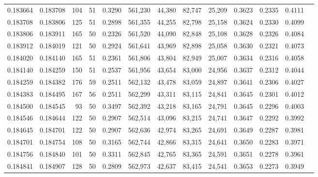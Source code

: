 \begin{tabular}{rrrrrrrrrrrrr}
0.183664 & 0.183708 &   104 &  51 &                                     0.3290 & 561,230 &  44,380 &  82,747 &  25,209 & 0.3623 & 0.2335 & 0.4111 \\
0.183708 & 0.183806 &   125 &  51 &                                     0.2898 & 561,355 &  44,255 &  82,798 &  25,158 & 0.3624 & 0.2330 & 0.4099 \\
0.183806 & 0.183911 &   165 &  50 &                                     0.2326 & 561,520 &  44,090 &  82,848 &  25,108 & 0.3628 & 0.2326 & 0.4084 \\
0.183912 & 0.184019 &   121 &  50 &                                     0.2924 & 561,641 &  43,969 &  82,898 &  25,058 & 0.3630 & 0.2321 & 0.4073 \\
0.184020 & 0.184140 &   165 &  51 &                                     0.2361 & 561,806 &  43,804 &  82,949 &  25,007 & 0.3634 & 0.2316 & 0.4058 \\
0.184140 & 0.184259 &   150 &  51 &                                     0.2537 & 561,956 &  43,654 &  83,000 &  24,956 & 0.3637 & 0.2312 & 0.4044 \\
0.184259 & 0.184382 &   176 &  59 &                                     0.2511 & 562,132 &  43,478 &  83,059 &  24,897 & 0.3641 & 0.2306 & 0.4027 \\
0.184383 & 0.184495 &   167 &  56 &                                     0.2511 & 562,299 &  43,311 &  83,115 &  24,841 & 0.3645 & 0.2301 & 0.4012 \\
0.184500 & 0.184545 &    93 &  50 &                                     0.3497 & 562,392 &  43,218 &  83,165 &  24,791 & 0.3645 & 0.2296 & 0.4003 \\
0.184546 & 0.184644 &   122 &  50 &                                     0.2907 & 562,514 &  43,096 &  83,215 &  24,741 & 0.3647 & 0.2292 & 0.3992 \\
0.184645 & 0.184701 &   122 &  50 &                                     0.2907 & 562,636 &  42,974 &  83,265 &  24,691 & 0.3649 & 0.2287 & 0.3981 \\
0.184701 & 0.184754 &   108 &  50 &                                     0.3165 & 562,744 &  42,866 &  83,315 &  24,641 & 0.3650 & 0.2283 & 0.3971 \\
0.184756 & 0.184840 &   101 &  50 &                                     0.3311 & 562,845 &  42,765 &  83,365 &  24,591 & 0.3651 & 0.2278 & 0.3961 \\
0.184841 & 0.184907 &   128 &  50 &                                     0.2809 & 562,973 &  42,637 &  83,415 &  24,541 & 0.3653 & 0.2273 & 0.3949 \\

\end{tabular}
